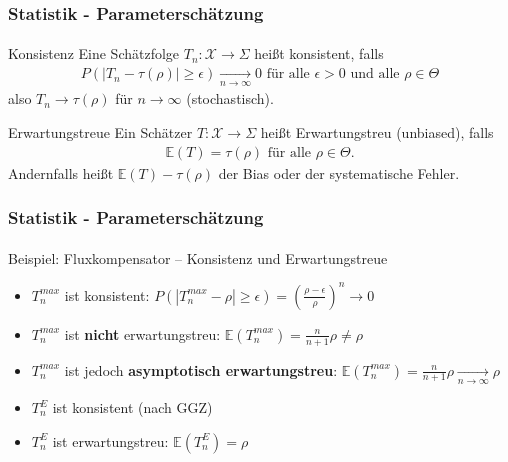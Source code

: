 \documentclass{beamer}
\begin{document}
\begin{frame}
    \frametitle{Statistik - Parameterschätzung}
\framesubtitle{}

\begin{block}{Konsistenz}
Eine Schätzfolge $T_n: \mathcal{X} \to \Sigma$  heißt konsistent, falls
\begin{align*}
P( |T_n - \tau(\rho)  |  \geq \epsilon)  \underset {n \to \infty}{\longrightarrow} 0 \text{ für alle } \epsilon > 0 \text { und alle } \rho \in \Theta  
\end{align*}
also $T_n \to \tau(\rho)$ für $n \to \infty$  (stochastisch).
\end{block}
\begin{block}{Erwartungstreue}
Ein Schätzer $T: \mathcal{X} \to \Sigma$  heißt Erwartungstreu (unbiased), falls
\begin{align*}
\mathbb{E}(T) = \tau(\rho) \text{ für alle } \rho \in \Theta.
\end{align*}
Andernfalls heißt $\mathbb{E}(T) - \tau(\rho) $ der Bias oder der systematische Fehler.
\end{block}
 \end{frame}


\begin{frame}
    \frametitle{Statistik - Parameterschätzung}
\framesubtitle{}

\begin{block}{Beispiel: Fluxkompensator -- Konsistenz und Erwartungstreue}
\begin{itemize}
\item $T_n^{max}$ ist konsistent: $P(|T_n^{max} - \rho| \geq \epsilon) = \left(\frac{\rho - \epsilon}{\rho}\right)^n \to 0$
\item $T_n^{max}$ ist \textbf{nicht} erwartungstreu: $\mathbb{E}(T_n^{max}) = \frac{n}{n+1}\rho \neq \rho$
\item $T_n^{max}$ ist jedoch \textbf{asymptotisch erwartungstreu}: $\mathbb{E}(T_n^{max}) = \frac{n}{n+1}\rho \underset{n \to \infty}{\longrightarrow} \rho$
\item $T_n^{E}$ ist konsistent (nach GGZ)
\item $T_n^{E}$ ist erwartungstreu: $\mathbb{E}(T_n^{E}) = \rho$
\end{itemize}
\end{block}
 \end{frame}
\end{document}
